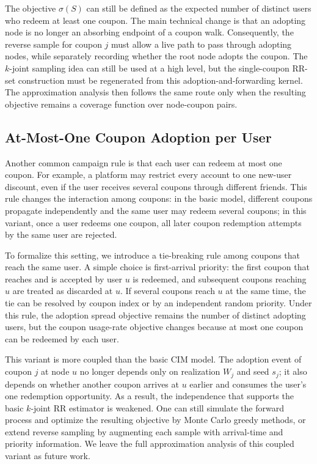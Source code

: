 \documentclass[sigconf]{acmart}
\begin{document}
The objective $\sigma(S)$ can still be defined as the expected number of
distinct users who redeem at least one coupon.
The main technical change is that an adopting node is no longer an
absorbing endpoint of a coupon walk.
Consequently, the reverse sample for coupon $j$ must allow a live path
to pass through adopting nodes, while separately recording whether the
root node adopts the coupon.
The $k$-joint sampling idea can still be used at a high level, but the
single-coupon RR-set construction must be regenerated from this
adoption-and-forwarding kernel.
The approximation analysis then follows the same route only when the
resulting objective remains a coverage function over node-coupon pairs.

\subsection{At-Most-One Coupon Adoption per User}
\label{sec:variant-one-coupon}

Another common campaign rule is that each user can redeem at most one
coupon.
For example, a platform may restrict every account to one new-user
discount, even if the user receives several coupons through different
friends.
This rule changes the interaction among coupons: in the basic model,
different coupons propagate independently and the same user may redeem
several coupons; in this variant, once a user redeems one coupon, all
later coupon redemption attempts by the same user are rejected.

To formalize this setting, we introduce a tie-breaking rule among
coupons that reach the same user.
A simple choice is first-arrival priority: the first coupon that reaches
and is accepted by user $u$ is redeemed, and subsequent coupons reaching
$u$ are treated as discarded at $u$.
If several coupons reach $u$ at the same time, the tie can be resolved by
coupon index or by an independent random priority.
Under this rule, the adoption spread objective remains the number of
distinct adopting users, but the coupon usage-rate objective changes
because at most one coupon can be redeemed by each user.

This variant is more coupled than the basic CIM model.
The adoption event of coupon $j$ at node $u$ no longer depends only on
realization $W_j$ and seed $s_j$; it also depends on whether another coupon
arrives at $u$ earlier and consumes the user's one redemption
opportunity.
As a result, the independence that supports the basic $k$-joint RR
estimator is weakened.
One can still simulate the forward process and optimize the resulting
objective by Monte Carlo greedy methods, or extend reverse sampling by
augmenting each sample with arrival-time and priority information.
We leave the full approximation analysis of this coupled variant as
future work.
\end{document}
